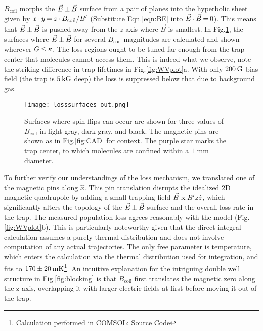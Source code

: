 \documentclass[%
 reprint,
 amsmath,amssymb,
 aps,
prl,
]{revtex4-1}
\newcommand{\bcl}{{$B_\text{coil}$}}
\newcommand{\epb}{{$\vec{E}\s {\perp}\s\vec{B}$}}
\newcommand{\s}{{\nobreak\hspace{.2em}}}
\begin{document}
\bcl{} morphs the \epb{} surface from a pair of planes into the hyperbolic sheet given by
$x\s {\cdot}\s y\s {=}\s  z\s {\cdot}\s B_\text{coil}/B'$
(Substitute Eqn.\s\ref{eqn:BE} into  $\vec{E}\s {\cdot}\s\vec{B}\s {=}\s 0$).
This means that \epb{} is pushed away from the $z$-axis where $\vec{B}$ is smallest.
In Fig.\s\ref{fig:LSurfs}, the surfaces where \epb{} for several \bcl{} magnitudes are calculated and shown wherever $G\s {\le}\s\kappa$.
The loss regions ought to be tuned far enough from the trap center that molecules cannot access them.
This is indeed what we observe, note the striking difference in trap lifetimes in Fig.\s\ref{fig:WVplot}a.
With only $200\s\text{G}$ bias field (the trap is $5\s\text{kG}$ deep) the loss is suppressed below that due to background gas.


\begin{figure}[tb]
\texttt{[image: losssurfaces\_out.png]}%
\caption{
Surfaces where spin-flips can occur are shown for three values of \bcl{} in light gray, dark gray, and black.
The magnetic pins are shown as in Fig.\s\ref{fig:CAD} for context.
The purple star marks the trap center, to which molecules are confined within a \protect\raisebox{2.5px}{\texttildelow} $\!\!1\text{ mm}$ diameter.
\label{fig:LSurfs}}
\end{figure}

To further verify our understandings of the loss mechanism, we translated one of the magnetic pins along $\hat{x}$.
This pin translation disrupts the idealized 2D magnetic quadrupole by adding a small trapping field $\vec{B} \s {\propto}\s  B^\prime z\hat{z}$, which significantly alters the topology of the \epb{} surface and the overall loss rate in the trap.
The measured population loss agrees reasonably with the model (Fig.\s\ref{fig:WVplot}b). This is particularly noteworthy given that the direct integral calculation assumes a purely thermal distribution and does not involve computation of any actual trajectories.
The only free parameter is temperature, which enters the calculation via the thermal distribution used for integration, and fits to $170\s {\pm}\s 20\s\text{mK}$\s\footnote{Calculation performed in COMSOL: \href{https://github.com/dreens/spin-flip-integration/}{Source Code}}.
An intuitive explanation for the intriguing double well structure in Fig.\s\ref{fig:blocking} is that \bcl{} first translates the magnetic zero along the z-axis, overlapping it with larger electric fields at first before moving it out of the trap.
\end{document}
